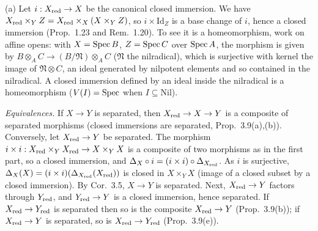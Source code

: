 \documentclass[11pt]{article}
\begin{document}
\pf
(a) Let $i:X_{\rm red}\to X$ be the canonical closed immersion. We have $X_{\rm red}\times_YZ=X_{\rm red}\times_X(X\times_YZ)$, so $i\times\mathrm{Id}_Z$ is a base change of $i$, hence a closed immersion (Prop.~1.23 and Rem.~1.20). To see it is a homeomorphism, work on affine opens: with $X=\operatorname{Spec} B$, $Z=\operatorname{Spec} C$ over $\operatorname{Spec} A$, the morphism is given by $B\otimes_AC\to(B/\mathfrak N)\otimes_AC$ ($\mathfrak N$ the nilradical), which is surjective with kernel the image of $\mathfrak N\otimes C$, an ideal generated by nilpotent elements and so contained in the nilradical. A closed immersion defined by an ideal inside the nilradical is a homeomorphism ($V(I)=\operatorname{Spec}$ when $I\subseteq\mathrm{Nil}$).

\emph{Equivalences.} If $X\to Y$ is separated, then $X_{\rm red}\to X\to Y$ is a composite of separated morphisms (closed immersions are separated, Prop.~3.9(a),(b)). Conversely, let $X_{\rm red}\to Y$ be separated. The morphism $i\times i:X_{\rm red}\times_YX_{\rm red}\to X\times_YX$ is a composite of two morphisms as in the first part, so a closed immersion, and $\Delta_X\circ i=(i\times i)\circ\Delta_{X_{\rm red}}$. As $i$ is surjective, $\Delta_X(X)=(i\times i)(\Delta_{X_{\rm red}}(X_{\rm red}))$ is closed in $X\times_YX$ (image of a closed subset by a closed immersion). By Cor.~3.5, $X\to Y$ is separated.
Next, $X_{\rm red}\to Y$ factors through $Y_{\rm red}$, and $Y_{\rm red}\to Y$ is a closed immersion, hence separated. If $X_{\rm red}\to Y_{\rm red}$ is separated then so is the composite $X_{\rm red}\to Y$ (Prop.~3.9(b)); if $X_{\rm red}\to Y$ is separated, so is $X_{\rm red}\to Y_{\rm red}$ (Prop.~3.9(e)).
\end{document}
